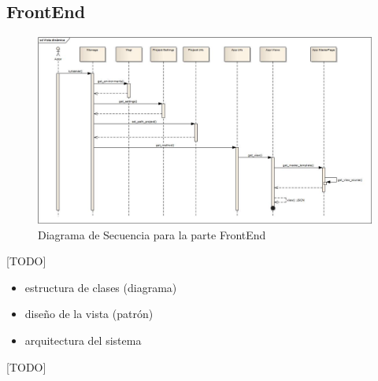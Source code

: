 \subsection{FrontEnd}

\begin{figure}[H]
\includegraphics[scale=.4]{diagramas/secuencia-front.jpg}
\caption{Diagrama de Secuencia para la parte FrontEnd}
\end{figure}

[TODO]

\begin{itemize}
\item estructura de clases (diagrama)
\item diseño de la vista (patrón)
\item arquitectura del sistema 
\end{itemize}

[TODO]
